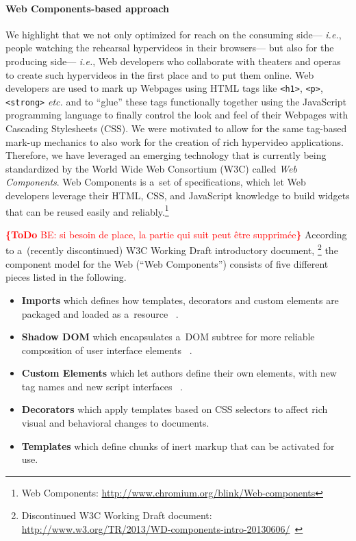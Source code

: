 \documentclass[conference]{IEEEtran}
\newcommand{\todo}[1]{\noindent\textcolor{red}{{\bf \{ToDo} #1{\bf \}}}}
\begin{document}
\paragraph{Web Components-based approach}
We highlight that we not only optimized for reach on the consuming side---%
\emph{i.e.}, people watching the rehearsal hypervideos in their browsers---%
but also for the producing side---%
\emph{i.e.}, Web developers who collaborate with theaters and operas
to create such hypervideos in the first place and to put them online.
Web developers are used to mark up Webpages using HTML tags
like \texttt{<h1>}, \texttt{<p>}, \texttt{<strong>} \emph{etc.}
and to ``glue'' these tags functionally together using the JavaScript programming language
to finally control the look and feel of their Webpages with Cascading Stylesheets (CSS).
We were motivated to allow for the same tag-based mark-up mechanics
to also work for the creation of rich hypervideo applications.
Therefore, we have leveraged an emerging technology
that is currently being standardized by the World Wide Web Consortium (W3C)
called \emph{Web Components}.
Web Components is a~set of specifications, which let Web developers leverage
their HTML, CSS, and JavaScript knowledge to build widgets
that can be reused easily and reliably.\footnote{Web Components:
\url{http://www.chromium.org/blink/Web-components}}

\todo{BE: si besoin de place, la partie qui suit peut être supprimée}
According to a~(recently discontinued) W3C Working Draft introductory document,%
\footnote{Discontinued W3C Working Draft document:
\url{http://www.w3.org/TR/2013/WD-components-intro-20130606/}~\cite{cooney2013Webcomponents}}
the component model for the Web (``Web Components'') consists of five different pieces
listed in the following.

\begin{itemize}
  \item \textbf{Imports} which defines how templates, decorators and custom elements are packaged and loaded as a~resource%
  ~\cite{glazkov2014htmlimports}.
  \item \textbf{Shadow DOM} which encapsulates a~DOM subtree for more reliable composition of user interface elements%
  ~\cite{glazkov2014shadowdom}.    
  \item \textbf{Custom Elements} which let authors define their own elements, with new tag names and new script interfaces%
  ~\cite{glazkov2013customelements}.  
  \item \textbf{Decorators} which apply templates based on CSS selectors to affect rich visual and behavioral changes to documents.
  \item \textbf{Templates} which define chunks of inert markup that can be activated for use.  
\end{itemize}
\end{document}
